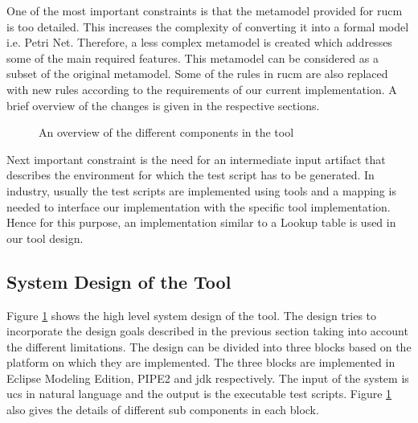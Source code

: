 One of the most important constraints is that the metamodel provided for \gls{rucm} is too detailed. This increases the complexity of converting it into a formal model i.e. Petri Net. Therefore, a less complex metamodel is created which addresses some of the main required features. This metamodel can be considered as a subset of the original metamodel. Some of the rules in \gls{rucm} are also replaced with new rules according to the requirements of our current implementation. A brief overview of the changes is given in the respective sections.

\begin{figure}[htb!]
\centering
{}
\caption{An overview of the different components in the tool}
\label{fig:systemdesign}
\end{figure}

Next important constraint is the need for an intermediate input artifact that describes the environment for which the test script has to be generated. In industry, usually the test scripts are implemented using tools and a mapping is needed to interface our implementation with the specific tool implementation.  Hence for this purpose, an implementation similar to a Lookup table is used in our tool design.

\subsection{System Design of the Tool}
Figure \ref{fig:systemdesign} shows the high level system design of the tool. The design tries to incorporate the design goals described in the previous section taking into account the different limitations. The design can be divided into three blocks based on the platform on which they are implemented. The three blocks are implemented in Eclipse Modeling Edition, PIPE2 and \gls{jdk} respectively. The input of the system is \gls{ucs} in natural language and the output is the executable test scripts. Figure \ref{fig:systemdesign} also gives the details of different sub components in each block.

